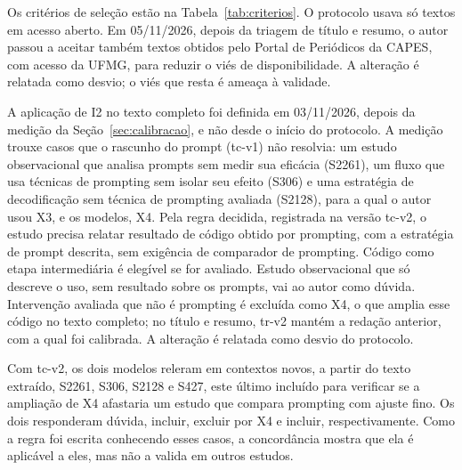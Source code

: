 Os critérios de seleção estão na Tabela~\ref{tab:criterios}. O protocolo usava só textos em acesso aberto. Em 05/11/2026, depois da triagem de título e resumo,
o autor passou a aceitar também textos obtidos pelo Portal de Periódicos da CAPES, com acesso da UFMG,
para reduzir o viés de disponibilidade. A alteração é relatada como desvio; o viés que resta é ameaça à validade.

A aplicação de I2 no texto completo foi definida em 03/11/2026, depois da medição da
Seção~\ref{sec:calibracao}, e não desde o início do protocolo. A medição trouxe casos que o rascunho
do prompt (tc-v1) não resolvia: um estudo observacional que analisa prompts sem medir sua eficácia
(S2261), um fluxo que usa técnicas de prompting sem isolar seu efeito (S306) e uma estratégia de
decodificação sem técnica de prompting avaliada (S2128), para a qual o autor usou X3, e os modelos, X4.
Pela regra decidida, registrada na versão tc-v2, o estudo precisa relatar resultado de código obtido por
prompting, com a estratégia de prompt descrita, sem exigência de comparador de prompting. Código como
etapa intermediária é elegível se for avaliado. Estudo observacional que só descreve o uso, sem resultado
sobre os prompts, vai ao autor como dúvida. Intervenção avaliada que não é prompting é excluída como X4,
o que amplia esse código no texto completo; no título e resumo, tr-v2 mantém a redação anterior, com a qual
foi calibrada. A alteração é relatada como desvio do protocolo.

Com tc-v2, os dois modelos releram em contextos novos, a partir do texto extraído, S2261, S306, S2128 e S427,
este último incluído para verificar se a ampliação de X4 afastaria um estudo que compara prompting com ajuste
fino. Os dois responderam dúvida, incluir, excluir por X4 e incluir, respectivamente. Como a regra foi escrita
conhecendo esses casos, a concordância mostra que ela é aplicável a eles, mas não a valida em outros estudos.

